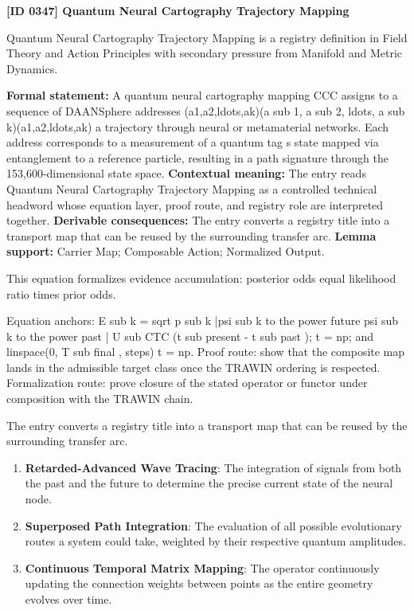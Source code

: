 \clearpage
\noindent\textbf{[ID 0347] Quantum Neural Cartography Trajectory Mapping}\par
\vspace{0.35em}
\begingroup\small
{}
Quantum Neural Cartography Trajectory Mapping is a registry definition in Field Theory and Action Principles with secondary pressure from Manifold and Metric Dynamics.

\begingroup\footnotesize\setlength{\emergencystretch}{3em}\sloppy
\textbf{Formal statement:} A quantum neural cartography mapping CCC assigns to a sequence of DAANSphere addresses (a1,a2,ldots,ak)(a sub 1, a sub 2, ldots, a sub k)(a1,a2,ldots,ak) a trajectory through neural or metamaterial networks. Each address corresponds to a measurement of a quantum tag s state mapped via entanglement to a reference particle, resulting in a path signature through the 153,600-dimensional state space. \textbf{Contextual meaning:} The entry reads Quantum Neural Cartography Trajectory Mapping as a controlled technical headword whose equation layer, proof route, and registry role are interpreted together. \textbf{Derivable consequences:} The entry converts a registry title into a transport map that can be reused by the surrounding transfer arc. \textbf{Lemma support:} Carrier Map; Composable Action; Normalized Output.\par
\endgroup

This equation formalizes evidence accumulation: posterior odds equal likelihood ratio times prior odds.

Equation anchors: E sub k = sqrt p sub k |psi sub k to the power future psi sub k to the power past | U sub CTC (t sub present - t sub past ); t = np; and linspace(0, T sub final , steps) t = np. Proof route: show that the composite map lands in the admissible target class once the TRAWIN ordering is respected. Formalization route: prove closure of the stated operator or functor under composition with the TRAWIN chain.

The entry converts a registry title into a transport map that can be reused by the surrounding transfer arc.
\endgroup

\begin{enumerate}[leftmargin=1.6em,itemsep=6pt,topsep=4pt]
\item \textbf{Retarded-Advanced Wave Tracing}: The integration of signals from both the past and the future to determine the precise current state of the neural node.
\item \textbf{Superposed Path Integration}: The evaluation of all possible evolutionary routes a system could take, weighted by their respective quantum amplitudes.
\item \textbf{Continuous Temporal Matrix Mapping}: The operator continuously updating the connection weights between points as the entire geometry evolves over time.
\end{enumerate}


